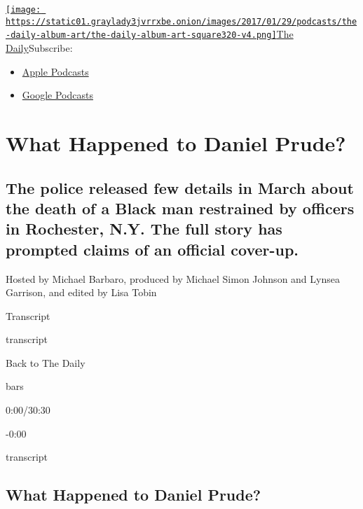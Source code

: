 \href{https://www.nytimes3xbfgragh.onion/column/the-daily}{\texttt{[image: https://static01.graylady3jvrrxbe.onion/images/2017/01/29/podcasts/the-daily-album-art/the-daily-album-art-square320-v4.png]}The
Daily}Subscribe:

\begin{itemize}
\tightlist
\item
  \href{https://itunes.apple.com/us/podcast/id1200361736}{Apple
  Podcasts}
\item
  \href{https://www.google.com/podcasts?feed=aHR0cHM6Ly9yc3MuYXJ0MTkuY29tL3RoZS1kYWlseQ\%3D\%3D}{Google
  Podcasts}
\end{itemize}

\hypertarget{what-happened-to-daniel-prude-1}{%
\section{What Happened to Daniel
Prude?}\label{what-happened-to-daniel-prude-1}}

\hypertarget{the-police-released-few-details-in-march-about-the-death-of-a-black-man-restrained-by-officers-in-rochester-ny-the-full-story-has-prompted-claims-of-an-official-cover-up-1}{%
\subsection{The police released few details in March about the death of
a Black man restrained by officers in Rochester, N.Y. The full story has
prompted claims of an official
cover-up.}\label{the-police-released-few-details-in-march-about-the-death-of-a-black-man-restrained-by-officers-in-rochester-ny-the-full-story-has-prompted-claims-of-an-official-cover-up-1}}

Hosted by Michael Barbaro, produced by Michael Simon Johnson and Lynsea
Garrison, and edited by Lisa Tobin

Transcript

transcript

Back to The Daily

bars

0:00/30:30

-0:00

transcript

\hypertarget{what-happened-to-daniel-prude-2}{%
\subsection{What Happened to Daniel
Prude?}\label{what-happened-to-daniel-prude-2}}

